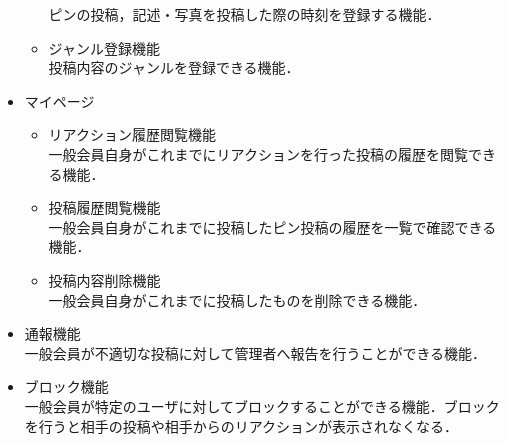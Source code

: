 \begin{itemize}[itemsep=10pt]
\begin{itemize}[itemsep=10pt]
        ピンの投稿，記述・写真を投稿した際の時刻を登録する機能．
        \item ジャンル登録機能 \mbox{}\\
        投稿内容のジャンルを登録できる機能．
    \end{itemize}
    \item マイページ
    \begin{itemize}[itemsep=10pt]
        \item リアクション履歴閲覧機能 \mbox{}\\
        一般会員自身がこれまでにリアクションを行った投稿の履歴を閲覧できる機能．
        \item 投稿履歴閲覧機能 \mbox{}\\
        一般会員自身がこれまでに投稿したピン投稿の履歴を一覧で確認できる機能．
        \item 投稿内容削除機能 \mbox{}\\
        一般会員自身がこれまでに投稿したものを削除できる機能．
    \end{itemize}
    \item 通報機能 \mbox{} \\
    一般会員が不適切な投稿に対して管理者へ報告を行うことができる機能．
    \item ブロック機能 \mbox{} \\
    一般会員が特定のユーザに対してブロックすることができる機能．ブロックを行うと相手の投稿や相手からのリアクションが表示されなくなる．
\end{itemize}

